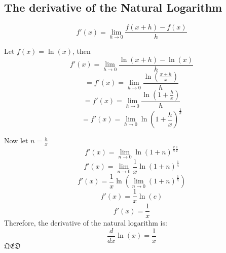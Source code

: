 \subsection{The derivative of the Natural Logarithm}

\[
f\prime(x) = \lim_{h \to 0} \frac{f(x + h) - f(x)}{h}
\]

\noindent Let $f(x) = \ln(x)$, then
\[
f\prime(x) = \lim_{h \to 0} \frac{\ln(x + h) - \ln(x)}{h}
\]
\[
= f\prime(x) = \lim_{h \to 0} \frac{\ln\left(\frac{x + h}{x}\right)}{h}
\]
\[
= f\prime(x) = \lim_{h \to 0} \frac{\ln\left(1 + \frac{h}{x}\right)}{h}
\]
\[
= f\prime(x) = \lim_{h \to 0} \ln\left(1 + \frac{h}{x}\right)^{\frac{1}{h}}
\]

\noindent Now let $n = \frac{h}{x}$
\[
f\prime(x) = \lim_{n \to 0} \ln\left(1 + n\right)^{\frac{x}{h} \frac{1}{x}}
\]
\[
f\prime(x) = \lim_{n \to 0} \frac{1}{x} \ln\left(1 + n\right)^{\frac{1}{n}}
\]
\[
f\prime(x) = \frac{1}{x} \ln \left(\lim_{n \to 0} (1 + n)^{\frac{1}{n}}\right)
\]
\[
f\prime(x) = \frac{1}{x} \ln(e)
\]
\[
f\prime(x) = \frac{1}{x}
\]
\noindent Therefore, the derivative of the natural logarithm is:
\[
\frac{d}{dx} \ln(x) = \frac{1}{x}
\]
$\mathfrak{QED}$

\newpage


